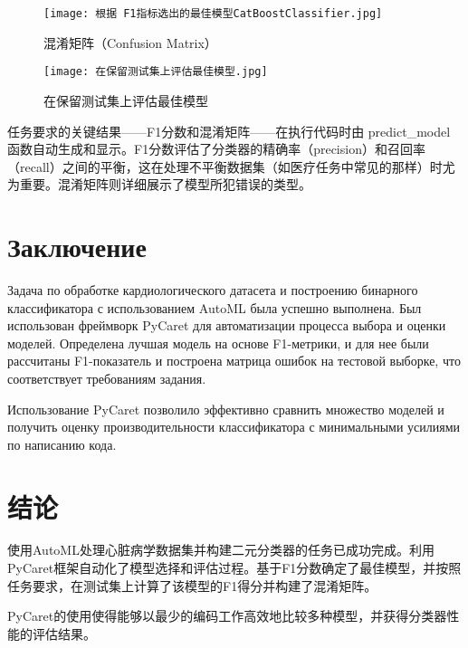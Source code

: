 \documentclass{article}
\providecommand{\pcsync}{\par\vspace{\baselineskip}}
\begin{document}
\begin{paracol}{2}
\begin{figure}[H]
    \centering
    \texttt{[image: 根据 F1指标选出的最佳模型CatBoostClassifier.jpg]}
    \caption{混淆矩阵（Confusion Matrix）}
    \label{fig:enter-label}
\end{figure}

\begin{figure}[H]
    \centering
    \texttt{[image: 在保留测试集上评估最佳模型.jpg]}
    \caption{在保留测试集上评估最佳模型}
    \label{fig:enter-label}
\end{figure}
任务要求的关键结果——F1分数和混淆矩阵——在执行代码时由 predict_model 函数自动生成和显示。F1分数评估了分类器的精确率（precision）和召回率（recall）之间的平衡，这在处理不平衡数据集（如医疗任务中常见的那样）时尤为重要。混淆矩阵则详细展示了模型所犯错误的类型。
\switchcolumn*


\section{Заключение}
\pcsync

Задача по обработке кардиологического датасета и построению бинарного классификатора с использованием AutoML была успешно выполнена. Был использован фреймворк PyCaret для автоматизации процесса выбора и оценки моделей. Определена лучшая модель на основе F1-метрики, и для нее были рассчитаны F1-показатель и построена матрица ошибок на тестовой выборке, что соответствует требованиям задания.

Использование PyCaret позволило эффективно сравнить множество моделей и получить оценку производительности классификатора с минимальными усилиями по написанию кода.
\switchcolumn

\section{结论}
\pcsync
使用AutoML处理心脏病学数据集并构建二元分类器的任务已成功完成。利用PyCaret框架自动化了模型选择和评估过程。基于F1分数确定了最佳模型，并按照任务要求，在测试集上计算了该模型的F1得分并构建了混淆矩阵。

PyCaret的使用使得能够以最少的编码工作高效地比较多种模型，并获得分类器性能的评估结果。
\switchcolumn*

\end{paracol}
\balance
\end{document}
